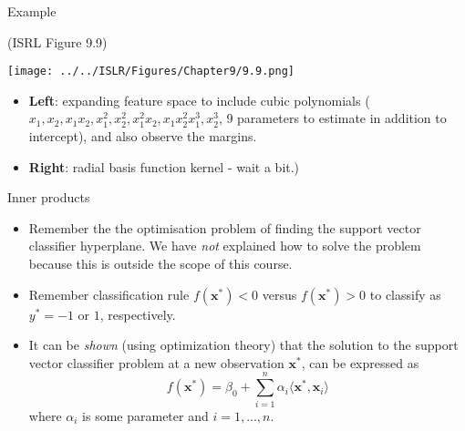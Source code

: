\documentclass[10pt,ignorenonframetext,]{beamer}
\begin{document}
\begin{frame}

\begin{block}{Example}

(ISRL Figure 9.9)

\centering
\texttt{[image: ../../ISLR/Figures/Chapter9/9.9.png]}

\flushleft

\begin{itemize}
\item
  \textbf{Left}: expanding feature space to include cubic polynomials
  (\(x_1,x_2,x_1x_2,x_1^2,x_2^2,x_1^2x_2,x_1x_2^2x_1^3,x_2^3\), 9
  parameters to estimate in addition to intercept), and also observe the
  margins.
\item
  \textbf{Right}: radial basis function kernel - wait a bit.)
\end{itemize}

\end{block}

\end{frame}

\begin{frame}

\begin{block}{Inner products}

\begin{itemize}
\item
  Remember the the optimisation problem of finding the support vector
  classifier hyperplane. We have \emph{not} explained how to solve the
  problem because this is outside the scope of this course.
\item
  Remember classification rule \(f({\boldsymbol x}^*)<0\) versus
  \(f({\boldsymbol x}^*)>0\) to classify as \(y^* = -1\) or \(1\),
  respectively.
\item
  It can be \emph{shown} (using optimization theory) that the solution
  to the support vector classifier problem at a new observation
  \({\boldsymbol x}^*\), can be expressed as \[
  f({\boldsymbol x}^*)=\beta_0 + \sum_{i=1}^n \alpha_i \langle {\boldsymbol x}^*,{\boldsymbol x}_i \rangle
  \] where \(\alpha_i\) is some parameter and \(i=1,...,n\).
\end{itemize}

\end{block}

\end{frame}
\end{document}
